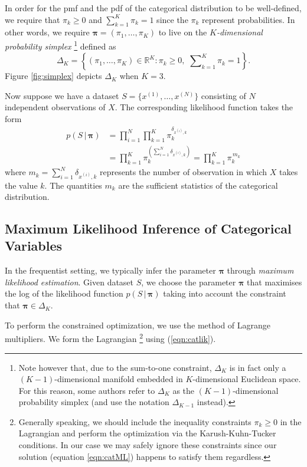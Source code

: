 \documentclass[final,3p,times,twocolumn]{elsarticle}
\let\bs\boldsymbol
\begin{document}
In order for the pmf and the pdf of the categorical distribution to be well-defined, we require that $\pi_k \geq 0$ and $\sum_{k=1}^K \pi_k = 1$ since the $\pi_k$ represent probabilities.
In other words, we require $\bs \pi = (\pi_1,\dots,\pi_K)$ to live on the \emph{$K$-dimensional probability simplex}
\footnote{Note however that, due to the sum-to-one constraint, $\Delta_K$ is in fact only a $(K-1)$-dimensional manifold embedded in $K$-dimensional Euclidean space.
For this reason, some authors refer to $\Delta_K$ as the $(K-1)$-dimensional probability simplex (and use the notation $\Delta_{K-1}$ instead).}
defined as
\begin{equation}
\label{eqn:simplex}
\Delta_K = \left\{(\pi_1,\dots,\pi_K) \in \mathbb{R}^K : \pi_k \geq 0,\,\, \sum \nolimits _{k=1}^K \pi_k = 1\right\}.
\end{equation}
Figure \ref{fig:simplex} depicts $\Delta_K$ when $K=3$.

Now suppose we have a dataset $S=\{ x^{(1)},\dots,x^{(N)} \}$ consisting of $N$ independent observations of $X$.
The corresponding likelihood function takes the form
\begin{equation}
\label{eqn:catlik}
\begin{split}
p(S\,|\,\bs \pi) &= \prod_{i=1}^N \prod_{k=1}^K \pi_k^{\delta_{x^{(i)},k}} \\ &= \prod_{k=1}^K \pi_k^{\left(\sum_{i=1}^N \delta_{x^{(i)},k}\right)} = \prod_{k=1}^K \pi_k^{\,m_k}
\end{split}
\end{equation}
where $m_k = \sum_{i=1}^N \delta_{x^{(i)}, k}$ represents the number of observation in which $X$ takes the value $k$.
The quantities $m_k$ are the sufficient statistics of the categorical distribution.

\subsection{Maximum Likelihood Inference of Categorical Variables}
In the frequentist setting, we typically infer the parameter $\bs \pi$ through \emph{maximum likelihood estimation}.
Given dataset $S$, we choose the parameter $\bs \pi$ that maximises the log of the likelihood function $p(S\,|\,\bs \pi)$ taking into account the constraint that $\bs \pi \in \Delta_K$.

To perform the constrained optimization, we use the method of Lagrange multipliers. We form the Lagrangian
\footnote{Generally speaking, we should include the inequality constraints $\pi_k \geq 0$ in the Lagrangian and perform the optimization via the Karush-Kuhn-Tucker conditions.
In our case we may safely ignore these constraints since our solution (equation \ref{eqn:catML}) happens to satisfy them regardless.}
using (\ref{eqn:catlik}).
\end{document}
